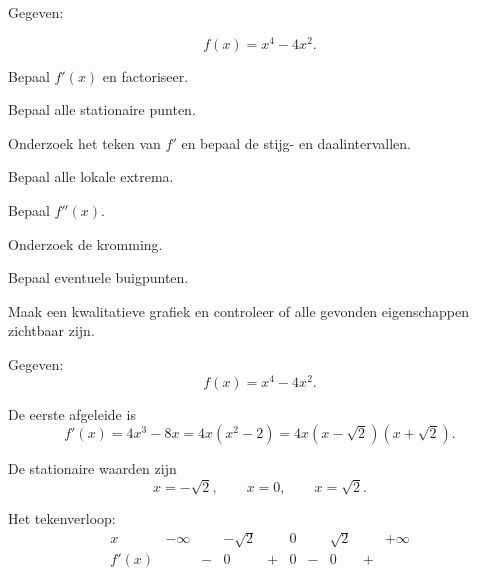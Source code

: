 \documentclass{ximera}
\begin{document}

\begin{oefening}{\oefU\ESS}

Gegeven:

\[
f(x)=x^4-4x^2.
\]

\begin{question}
Bepaal $f'(x)$ en factoriseer.
\end{question}

\begin{question}
Bepaal alle stationaire punten.
\end{question}

\begin{question}
Onderzoek het teken van $f'$ en bepaal de stijg- en daalintervallen.
\end{question}

\begin{question}
Bepaal alle lokale extrema.
\end{question}

\begin{question}
Bepaal $f''(x)$.
\end{question}

\begin{question}
Onderzoek de kromming.
\end{question}

\begin{question}
Bepaal eventuele buigpunten.
\end{question}

\begin{question}
Maak een kwalitatieve grafiek en controleer of alle gevonden
eigenschappen zichtbaar zijn.
\end{question}

\begin{oplossing}

Gegeven:
\[
f(x)=x^4-4x^2.
\]

De eerste afgeleide is
\[
f'(x)=4x^3-8x
=4x(x^2-2)
=4x(x-\sqrt2)(x+\sqrt2).
\]

De stationaire waarden zijn
\[
x=-\sqrt2,\qquad x=0,\qquad x=\sqrt2.
\]

Het tekenverloop:
\[
\begin{array}{c|ccccccccc}
x & -\infty & & -\sqrt2 & & 0 & & \sqrt2 & & +\infty\\ \hline
f'(x) & & - & 0 & + & 0 & - & 0 & + &
\end{array}
\]


\end{oplossing}
\end{oefening}
\end{document}
